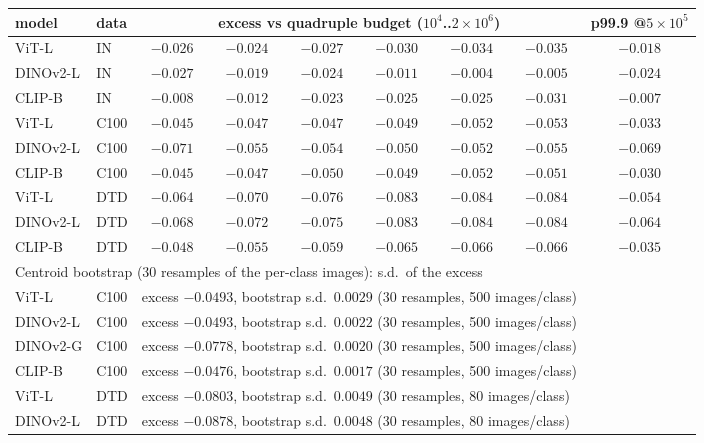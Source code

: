 \begin{table}[H]
\centering
\scriptsize
\setlength{\tabcolsep}{3pt}
\begin{tabular}{llcccccc|c}
\toprule
model & data & \multicolumn{6}{c|}{excess vs quadruple budget ($10^4$..$2{\times}10^6$)} & p99.9 @$5{\times}10^5$ \\
\midrule
ViT-L & IN & $-0.026$ & $-0.024$ & $-0.027$ & $-0.030$ & $-0.034$ & $-0.035$ & $-0.018$ \\
DINOv2-L & IN & $-0.027$ & $-0.019$ & $-0.024$ & $-0.011$ & $-0.004$ & $-0.005$ & $-0.024$ \\
CLIP-B & IN & $-0.008$ & $-0.012$ & $-0.023$ & $-0.025$ & $-0.025$ & $-0.031$ & $-0.007$ \\
ViT-L & C100 & $-0.045$ & $-0.047$ & $-0.047$ & $-0.049$ & $-0.052$ & $-0.053$ & $-0.033$ \\
DINOv2-L & C100 & $-0.071$ & $-0.055$ & $-0.054$ & $-0.050$ & $-0.052$ & $-0.055$ & $-0.069$ \\
CLIP-B & C100 & $-0.045$ & $-0.047$ & $-0.050$ & $-0.049$ & $-0.052$ & $-0.051$ & $-0.030$ \\
ViT-L & DTD & $-0.064$ & $-0.070$ & $-0.076$ & $-0.083$ & $-0.084$ & $-0.084$ & $-0.054$ \\
DINOv2-L & DTD & $-0.068$ & $-0.072$ & $-0.075$ & $-0.083$ & $-0.084$ & $-0.084$ & $-0.064$ \\
CLIP-B & DTD & $-0.048$ & $-0.055$ & $-0.059$ & $-0.065$ & $-0.066$ & $-0.066$ & $-0.035$ \\
\midrule
\multicolumn{9}{l}{Centroid bootstrap (30 resamples of the per-class images): s.d.\ of the excess} \\
ViT-L & C100 & \multicolumn{6}{l}{excess $-0.0493$, bootstrap s.d.\ $0.0029$ (30 resamples, 500 images/class)} & \\
DINOv2-L & C100 & \multicolumn{6}{l}{excess $-0.0493$, bootstrap s.d.\ $0.0022$ (30 resamples, 500 images/class)} & \\
DINOv2-G & C100 & \multicolumn{6}{l}{excess $-0.0778$, bootstrap s.d.\ $0.0020$ (30 resamples, 500 images/class)} & \\
CLIP-B & C100 & \multicolumn{6}{l}{excess $-0.0476$, bootstrap s.d.\ $0.0017$ (30 resamples, 500 images/class)} & \\
ViT-L & DTD & \multicolumn{6}{l}{excess $-0.0803$, bootstrap s.d.\ $0.0049$ (30 resamples, 80 images/class)} & \\
DINOv2-L & DTD & \multicolumn{6}{l}{excess $-0.0878$, bootstrap s.d.\ $0.0048$ (30 resamples, 80 images/class)} & \\

\end{tabular}
\end{table}
